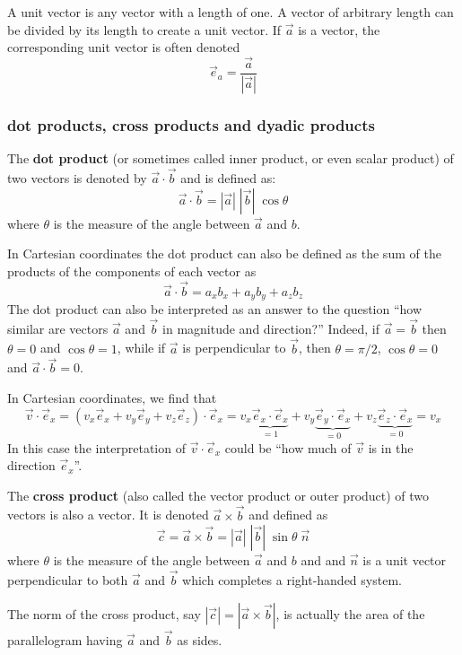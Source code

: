 A unit vector is any vector with a length of one. 
A vector of arbitrary length can be divided by its length to create a unit vector.
If $\vec{a}$ is a vector, the corresponding unit vector is often denoted
\[
\vec{e}_a = \frac{\vec{a}}{|\vec{a}|}
\]


\subsubsection{dot products, cross products and dyadic products}

The {\bf dot product} (or sometimes called inner product, or even scalar product) of two vectors is denoted by 
$\vec{a}\cdot \vec{b}$ and is defined as:
\[
\vec{a}\cdot \vec{b} = |\vec{a}| \; |\vec{b}| \; \cos\theta
\]
where $\theta$  is the measure of the angle between $\vec{a}$ and ${b}$.


In Cartesian coordinates the dot product can also be defined as the sum 
of the products of the components of each vector as
\[
\vec{a}\cdot\vec{b} = a_xb_x + a_yb_y + a_zb_z  
\]
The dot product can also be interpreted as an answer to the question ``how similar are vectors $\vec{a}$
and $\vec{b}$ in magnitude and direction?'' Indeed, if $\vec{a}=\vec{b}$ then $\theta=0$ and $\cos\theta=1$, while if 
$\vec{a}$ is perpendicular to $\vec{b}$, then $\theta=\pi/2$, $\cos\theta=0$ and $\vec{a}\cdot \vec{b}=0$. 

In Cartesian coordinates, we find that 
\[
\vec{v} \cdot \vec{e}_x 
= (v_x \vec{e}_x + v_y \vec{e}_y + v_z \vec{e}_z ) \cdot \vec{e}_x
= v_x \underbrace{\vec{e}_x \cdot \vec{e}_x}_{=1}
+ v_y \underbrace{\vec{e}_y \cdot \vec{e}_x}_{=0}
+ v_z \underbrace{\vec{e}_z \cdot \vec{e}_x}_{=0} 
=v_x
\]
In this case the interpretation of $\vec{v} \cdot \vec{e}_x$ could be ``how much of $\vec{v}$
is in the direction $\vec{e}_x$''.

The {\bf cross product} (also  called the vector product or outer product) of two vectors is also a vector.
It is denoted $\vec{a} \times \vec{b}$ and defined as 
\[
\vec{c} = \vec{a} \times \vec{b} = |\vec{a}| \; |\vec{b}|\; \sin\theta \; \vec{n}
\]
where $\theta$  is the measure of the angle between $\vec{a}$ and ${b}$ and
and $\vec{n}$ is a unit vector perpendicular to both $\vec{a}$ and $\vec{b}$ 
which completes a right-handed system.


The norm of the cross product, say $|\vec{c}|=|\vec{a} \times \vec{b}|$, is actually the 
area of the parallelogram having $\vec{a}$ and $\vec{b}$ as sides.

